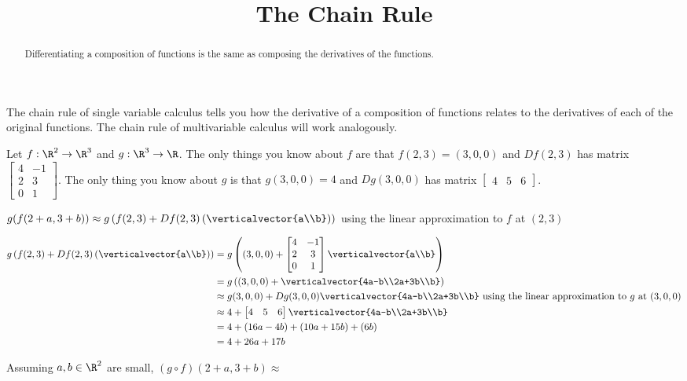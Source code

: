 \documentclass{ximera}
\title{The Chain Rule}
\begin{document}
\begin{abstract}
	Differentiating a composition of functions is the same as composing the derivatives of the functions.
\end{abstract}
\maketitle


The chain rule of single variable calculus tells you how the derivative of a composition of functions relates to the derivatives of each of the original functions.
The chain rule of multivariable calculus will work analogously.

\begin{question}
	Let $f:\R^2 \to \R^3$ and $g:\R^3 \to \R$.  The only things you know about $f$ are that $f(2,3) = (3,0,0)$ and $Df(2,3)$ 
	has matrix \(\begin{bmatrix}  4 & -1 \\2& 3\\ 0 &1\end{bmatrix}\).  The only thing you know about $g$ is that $g(3,0,0) = 4$ and $Dg(3,0,0)$ has matrix
	\(\begin{bmatrix} 4&5&6 \end{bmatrix}\).  
	\begin{solution}
		\begin{hint}
			$g(f(2+a,3+b)) \approx g\left(f(2,3)+Df(2,3)\left(\verticalvector{a\\b}\right)\right)$ using the linear approximation to $f$ at $(2,3)$ 
		\end{hint}
		\begin{hint}
			\begin{align*}
				g\left(f(2,3)+Df(2,3)\left(\verticalvector{a\\b}\right)\right) & = g\left((3,0,0)+\begin{bmatrix}  4 & -1 \\2& 3\\ 0 &1\end{bmatrix} \verticalvector{a\\b}\right)\\
				&= g\left( (3,0,0)+ \verticalvector{4a-b\\2a+3b\\b}\right)\\
				&\approx g(3,0,0)+Dg(3,0,0)\verticalvector{4a-b\\2a+3b\\b} \text{ using the linear approximation to $g$ at $(3,0,0)$}\\
				&\approx 4+\begin{bmatrix} 4&5&6 \end{bmatrix}\verticalvector{4a-b\\2a+3b\\b}\\
				&=4+(16a-4b)+(10a+15b)+(6b)\\
				&=4+26a+17b
			\end{align*}
		\end{hint}
		Assuming $a,b \in \R^2$ are small,  $(g \circ f)(2+a,3+b) \approx$  
	\end{solution}
	

\end{question}
\end{document}
